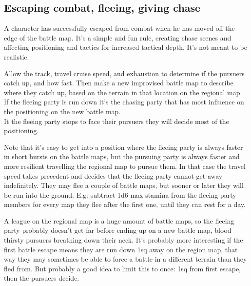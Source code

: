 

\subsection*{Escaping combat, fleeing, giving chase}
A character has successfully escaped from combat when he has moved off the edge of the battle map. It's a simple and fun rule, creating chase scenes and affecting positioning and tactics for increased tactical depth. It's not meant to be realistic.

Allow the track, travel cruise speed, and exhaustion to determine if the pursuers catch up, and how fast. Then make a new improvised battle map to describe where they catch up, based on the terrain in that location on the regional map.\\
If the fleeing party is run down it's the chasing party that has most influence on the positioning on the new battle map.\\
It the fleeing party stops to face their pursuers they will decide most of the positioning.

Note that it's easy to get into a position where the fleeing party is always faster in short bursts on the battle maps, but the pursuing party is always faster and more resilient travelling the regional map to pursue them. In that case the travel speed takes precedent and decides that the fleeing party cannot get away indefinitely. They may flee a couple of battle maps, but sooner or later they will be run into the ground. E.g: subtract 1d6 max stamina from the fleeing party members for every map they flee after the first one, until they can rest for a day.

A league on the regional map is a huge amount of battle maps, so the fleeing party probably doesn't get far before ending up on a new battle map, blood thirsty pursuers breathing down their neck. It's probably more interesting if the first battle escape means they are run down 1sq away on the region map, that way they may sometimes be able to force a battle in a different terrain than they fled from. But probably a good idea to limit this to once: 1sq from first escape, then the pursuers decide.

